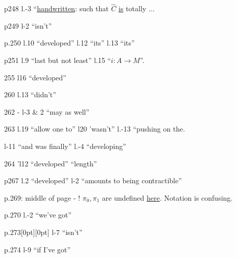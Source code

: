 \begin{minipage}{\linewidth}
p248 l.-3 ``\uline{handwritten}: such that $\widehat C$ \uline{is} totally ...

p249 l-2 ``isn't''

p.250 l.10 ``developed'' l.12 ``its'' l.13 ``its''

p251 l.9 ``last but not least'' l.15 ``$i\colon A\to M$''.

 255 l16 ``developed''

260 l.13 ``didn't''

262 - l-3 \& 2 ``may as well''

263 l.19 ``allow one to'' l20 'wasn't'' l.-13 ``pushing on the.

l-11 ``and was finally'' l.-4 ``developing''

264 'l12 ``developed'' ``length''

p267 l.2 ``developed'' l-2 ``amounts to  being contractible''

p.269: middle of page - !  $\pi_0,\pi_1$ are undefined \uline{here}. Notation is confusing.

p.270 l.-2 ``we've got''

p.273\hspace{.35em}\raisebox{.8ex}[0pt][0pt]{} l-7 ``isn't''

p.274 l-9 ``if I've got''



\end{minipage}
